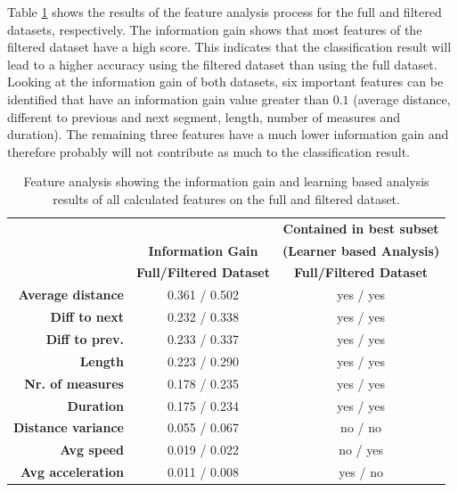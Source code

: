 Table \ref{table:feature_analysis} shows the results of the feature analysis process for the full and filtered datasets, respectively. The information gain shows that most features of the filtered dataset have a high score. This indicates that the classification result will lead to a higher accuracy using the filtered dataset than using the full dataset. Looking at the information gain of both datasets, six important features can be identified that have an information gain value greater than $0.1$ (average distance, different to previous and next segment, length, number of measures and duration). The remaining three features have a much lower information gain and therefore probably will not contribute as much to the classification result.


\begin{table}


\centering
\bgroup
\def\arraystretch{1.4}
\begin{tabular}{| r || c | c |}
\hline
   & 
   \textbf{} & 
   \textbf{Contained in best subset} \\
   & 
   \textbf{Information Gain} & 
   \textbf{(Learner based Analysis)} \\
   & 
   \textbf{Full/Filtered Dataset} & 
   \textbf{Full/Filtered Dataset} \\
\hline
  \textbf{Average distance} & 
   0.361 / 0.502 &
   yes / yes \\
\hline
\textbf{Diff to next} & 
   0.232 / 0.338 &
   yes / yes \\
\hline
\textbf{Diff to prev.} & 
   0.233 / 0.337 &
   yes / yes \\
\hline
\textbf{Length} & 
   0.223 / 0.290 &
   yes / yes \\
\hline
\textbf{Nr. of measures} & 
   0.178 / 0.235 &
   yes / yes \\
\hline
\textbf{Duration} & 
   0.175 / 0.234 &
   yes / yes \\
\hline
\textbf{Distance variance} & 
   0.055 / 0.067 &
   no / no \\
\hline
\textbf{Avg speed} & 
   0.019 / 0.022 &
   no / yes \\
\hline
\textbf{Avg acceleration} & 
   0.011 / 0.008 &
   yes / no \\
\hline


\end{tabular}
\egroup

\caption{Feature analysis showing the information gain and learning based analysis results of all calculated features on the full and filtered dataset.}
\label{table:feature_analysis}
\end{table}



